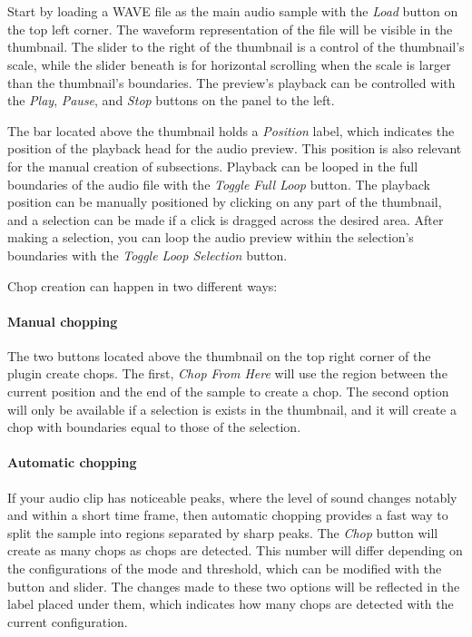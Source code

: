 \documentclass[12pt, a4paper, hidelinks]{article}
\begin{document}
	~\\
	~\\
	Start by loading a WAVE file as the main audio sample with the \textit{Load} button on the top left corner. The waveform representation of the file will be visible in the thumbnail. The slider to the right of the thumbnail is a control of the thumbnail's scale, while the slider beneath is for horizontal scrolling when the scale is larger than the thumbnail's boundaries. The preview's playback can be controlled with the \textit{Play}, \textit{Pause}, and \textit{Stop} buttons on the panel to the left. \par 
	The bar located above the thumbnail holds a \textit{Position} label, which indicates the position of the playback head for the audio preview. This position is also relevant for the manual creation of subsections. Playback can be looped in the full boundaries of the audio file with the \textit{Toggle Full Loop} button. The playback position can be manually positioned by clicking on any part of the thumbnail, and a selection can be made if a click is dragged across the desired area. After making a selection, you can loop the audio preview within the selection's boundaries with the \textit{Toggle Loop Selection} button. \par
	
	Chop creation can happen in two different ways:
	\paragraph{Manual chopping\\}
	The two buttons located above the thumbnail on the top right corner of the plugin create chops. The first, \textit{Chop From Here} will use the region between the current position and the end of the sample to create a chop. The second option will only be available if a selection is exists in the thumbnail, and it will create a chop with boundaries equal to those of the selection.
	\paragraph{Automatic chopping\\}
	If your audio clip has noticeable peaks, where the level of sound changes notably and within a short time frame, then automatic chopping provides a fast way to split the sample into regions separated by sharp peaks. The \textit{Chop} button will create as many chops as chops are detected. This number will differ depending on the configurations of the mode and threshold, which can be modified with the button and slider. The changes made to these two options will be reflected in the label placed under them, which indicates how many chops are detected with the current configuration.\par
	
\end{document}
